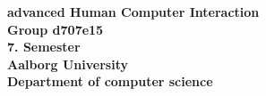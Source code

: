 \vspace*{\fill}

\begin{center}
		\Huge \textbf{advanced Human Computer Interaction}\normalsize \\
\vspace{5mm}
		\textbf{Group d707e15}\\
		\textbf{7. Semester}\\
		\textbf{Aalborg University}\\
		\textbf{Department of computer science}
\end{center}

\vspace*{\fill}
